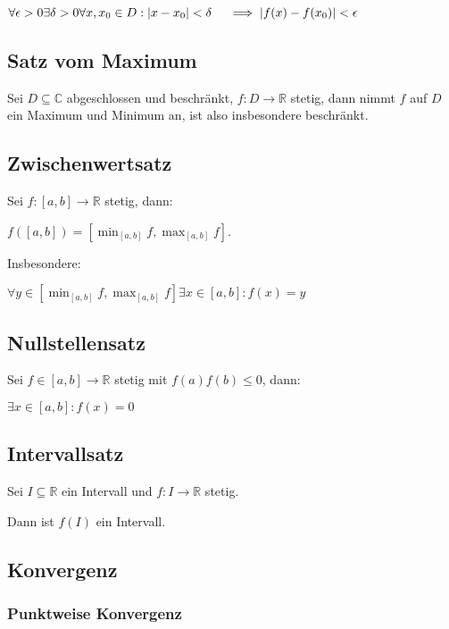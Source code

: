 $\forall \epsilon > 0 \exists \delta > 0 \forall x, x_0 \in D : | x - x_0 | < \delta \\ \hspace*{4mm} \implies | f(x) - f(x_0) | < \epsilon$

\subsection*{Satz vom Maximum}

Sei $D \subseteq \mathbb{C}$ abgeschlossen und beschränkt, $f: D \rightarrow \mathbb{R}$ stetig, dann nimmt $f$ auf $D$ ein Maximum und Minimum an, ist also insbesondere beschränkt.

\subsection*{Zwischenwertsatz}

Sei $f: [a, b] \rightarrow \mathbb{R}$ stetig, dann:

$f([a, b]) = [\min_{[a, b]} f, \max_{[a, b]} f]$.

Insbesondere:

$\forall y \in [\min_{[a, b]} f, \max_{[a, b]} f] \exists x \in [a, b]: f(x)=y$

\subsection*{Nullstellensatz}

Sei $f \in [a, b] \rightarrow \mathbb{R}$ stetig mit $f(a)f(b) \leq 0$, dann:

$\exists x \in [a, b]: f(x) = 0$

\subsection*{Intervallsatz}

Sei $I \subseteq \mathbb{R}$ ein Intervall und $f : I \rightarrow \mathbb{R}$ stetig.

Dann ist $f(I)$ ein Intervall.

\subsection*{Konvergenz}

\subsubsection*{Punktweise Konvergenz}


